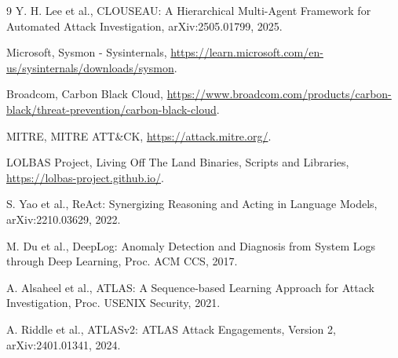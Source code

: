 \documentclass[a4paper,twocolumn,10pt]{article}
\begin{document}
\begin{thebibliography}{9}
Y. H. Lee et al., CLOUSEAU: A Hierarchical Multi-Agent Framework for Automated Attack Investigation, arXiv:2505.01799, 2025.

Microsoft, Sysmon - Sysinternals, \url{https://learn.microsoft.com/en-us/sysinternals/downloads/sysmon}.

Broadcom, Carbon Black Cloud, \url{https://www.broadcom.com/products/carbon-black/threat-prevention/carbon-black-cloud}.

MITRE, MITRE ATT\&CK, \url{https://attack.mitre.org/}.

LOLBAS Project, Living Off The Land Binaries, Scripts and Libraries, \url{https://lolbas-project.github.io/}.

S. Yao et al., ReAct: Synergizing Reasoning and Acting in Language Models, arXiv:2210.03629, 2022.

M. Du et al., DeepLog: Anomaly Detection and Diagnosis from System Logs through Deep Learning, Proc. ACM CCS, 2017.

A. Alsaheel et al., ATLAS: A Sequence-based Learning Approach for Attack Investigation, Proc. USENIX Security, 2021.

A. Riddle et al., ATLASv2: ATLAS Attack Engagements, Version 2, arXiv:2401.01341, 2024.
\end{thebibliography}
\end{document}
